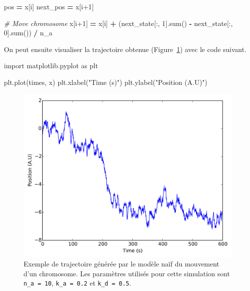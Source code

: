 \documentclass[12pt,a4paper,twoside,openright]{book}
\newenvironment{Shaded}{\begin{snugshade}}{\end{snugshade}}
\newcommand{\DecValTok}[1]{\textcolor[rgb]{0.00,0.00,0.81}{{#1}}}
\newcommand{\StringTok}[1]{\textcolor[rgb]{0.31,0.60,0.02}{{#1}}}
\newcommand{\ImportTok}[1]{{#1}}
\newcommand{\CommentTok}[1]{\textcolor[rgb]{0.56,0.35,0.01}{\textit{{#1}}}}
\newcommand{\OperatorTok}[1]{\textcolor[rgb]{0.81,0.36,0.00}{\textbf{{#1}}}}
\newcommand{\BuiltInTok}[1]{{#1}}
\newcommand{\NormalTok}[1]{{#1}}
\begin{document}
\begin{Shaded}
\begin{Highlighting}[]
    \NormalTok{pos }\OperatorTok{=} \NormalTok{x[i]}
    \NormalTok{next_pos }\OperatorTok{=} \NormalTok{x[i}\DecValTok{+1}\NormalTok{]}

    \CommentTok{# Move chromosome}
    \NormalTok{x[i}\DecValTok{+1}\NormalTok{] }\OperatorTok{=} \NormalTok{x[i] }\OperatorTok{+} \NormalTok{(next_state[:, }\DecValTok{1}\NormalTok{].}\BuiltInTok{sum}\NormalTok{() }\OperatorTok{-} \NormalTok{next_state[:, }\DecValTok{0}\NormalTok{].}\BuiltInTok{sum}\NormalTok{()) }\OperatorTok{/} \NormalTok{n_a}
\end{Highlighting}
\end{Shaded}

On peut ensuite visualiser la trajectoire obtenue
(Figure~\ref{fig:simu-oscill-trajectory}) avec le code suivant.

\begin{Shaded}
\begin{Highlighting}[]
\ImportTok{import} \NormalTok{matplotlib.pyplot }\ImportTok{as} \NormalTok{plt}

\NormalTok{plt.plot(times, x)}
\NormalTok{plt.xlabel(}\StringTok{"Time (s)"}\NormalTok{)}
\NormalTok{plt.ylabel(}\StringTok{"Position (A.U)"}\NormalTok{)}
\end{Highlighting}
\end{Shaded}

\begin{figure}[htbp]
\centering
\includegraphics{figures/annexes/simu_oscill_trajectory.png}
\caption[Exemple de trajectoire générée par le modèle naïf du mouvement d'un chromosome]{\label{fig:simu-oscill-trajectory}Exemple
de trajectoire générée par le modèle naïf du mouvement d'un chromosome.
Les paramètres utilisés pour cette simulation sont \texttt{n\_a\ =\ 10},
\texttt{k\_a\ =\ 0.2} et \texttt{k\_d\ =\ 0.5}.}
\end{figure}
\end{document}
